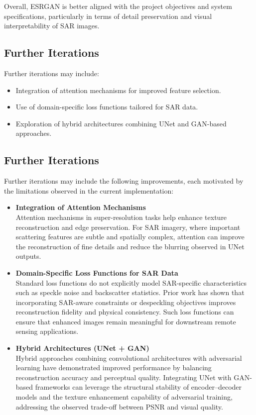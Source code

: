 \documentclass[conference]{IEEEtran}
\begin{document}
Overall, ESRGAN is better aligned with the project objectives and system specifications, particularly in terms of detail preservation and visual interpretability of SAR images.


\subsection{Further Iterations}

Further iterations may include:

\begin{itemize}
    \item Integration of attention mechanisms for improved feature selection.
    \item Use of domain-specific loss functions tailored for SAR data.
    \item Exploration of hybrid architectures combining UNet and GAN-based approaches.
\end{itemize}

\subsection{Further Iterations}

Further iterations may include the following improvements, each motivated by the limitations observed in the current implementation:

\begin{itemize}
    \item \textbf{Integration of Attention Mechanisms} \\
    Attention mechanisms in super-resolution tasks help enhance texture reconstruction and edge preservation. For SAR imagery, where important scattering features are subtle and spatially complex, attention can improve the reconstruction of fine details and reduce the blurring observed in UNet outputs.

    \item \textbf{Domain-Specific Loss Functions for SAR Data}\\
    Standard loss functions do not explicitly model SAR-specific characteristics such as speckle noise and backscatter statistics. Prior work has shown that incorporating SAR-aware constraints or despeckling objectives improves reconstruction fidelity and physical consistency\cite{dalsasso2020sar}. Such loss functions can ensure that enhanced images remain meaningful for downstream remote sensing applications.

    \item \textbf{Hybrid Architectures (UNet + GAN)} \\
    Hybrid approaches combining convolutional architectures with adversarial learning have demonstrated improved performance by balancing reconstruction accuracy and perceptual quality\cite{ledig2017photo, wang2018esrgan}. Integrating UNet with GAN-based frameworks can leverage the structural stability of encoder–decoder models and the texture enhancement capability of adversarial training, addressing the observed trade-off between PSNR and visual quality.
\end{itemize}
\end{document}
